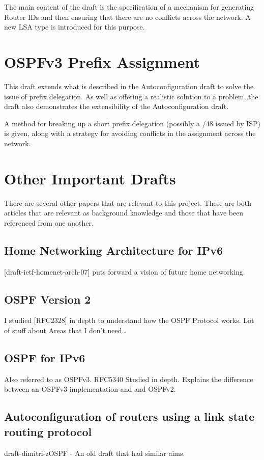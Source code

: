 \documentclass[12pt]{report}
\begin{document}
The main content of the draft is the specification of a mechanism for
generating Router IDs and then ensuring that there are no conflicts across the
network. A new LSA type is introduced for this purpose.

\section{OSPFv3 Prefix Assignment}
This draft extends what is described in the Autoconfiguration draft to solve
the issue of prefix delegation. As well as offering a realistic solution to a
problem, the draft also demonstrates the extensibility of the Autoconfiguration
draft. 

A method for breaking up a short prefix delegation (possibly a /48 issued by
ISP) is given, along with a strategy for avoiding conflicts in the assignment
across the network.

\section{Other Important Drafts}
There are several other papers that are relevant to this project. These are
both articles that are relevant as background knowledge and those that have
been referenced from one another.

\subsection{Home Networking Architecture for IPv6} 
[draft-ietf-homenet-arch-07] puts forward a vision of future home networking.

\subsection{OSPF Version 2}
I studied [RFC2328] in depth to understand how the OSPF Protocol works. Lot of
stuff about Areas that I don't need\ldots

\subsection{OSPF for IPv6}
Also referred to as OSPFv3. RFC5340 Studied in depth. Explains the difference
between an OSPFv3 implementation and and OSPFv2.

\subsection{Autoconfiguration of routers using a link state routing protocol}
draft-dimitri-zOSPF - An old draft that had similar aims.
\end{document}
